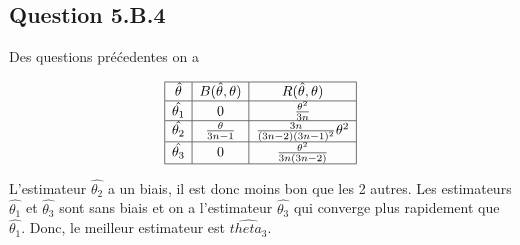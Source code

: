 \documentclass[]{book}
\theoremstyle{definition}
\begin{document}
\subsection*{Question 5.B.4}
Des questions pr\'e\'cedentes on a 

$$
\begin{array}{|c|c|c|}
    \hline
    \hat{\theta} & B(\hat{\theta},\theta) & R(\hat{\theta},\theta) \\
    \hline
    \hat{\theta_1} & 0 & \frac{\theta^2}{3n} \\
    \hline
    \hat{\theta_2} &  \frac{\theta}{3n-1} & \frac{3n}{(3n-2)(3n-1)^2}\theta^2 \\
    \hline
    \hat{\theta_3} & 0 & \frac{\theta^2}{3n(3n-2)} \\
    \hline
\end{array}
$$



L'estimateur $\hat{\theta_2}$ a un biais, il est donc moins bon que les 2 autres. Les estimateurs $\hat{\theta_1}$ et  $\hat{\theta_3}$ sont sans biais et on a l'estimateur $\hat{\theta_3}$ qui converge plus rapidement que $\hat{\theta_1}$. Donc, le meilleur estimateur est $\hat{theta_3}$.
\end{document}
